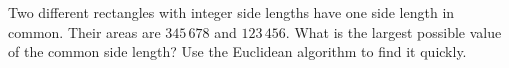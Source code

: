 Two different rectangles with integer side lengths have one side length in common. Their areas are $345\,678$ and $123\,456$. What is the largest possible value of the common side length? Use the Euclidean algorithm to find it quickly.

